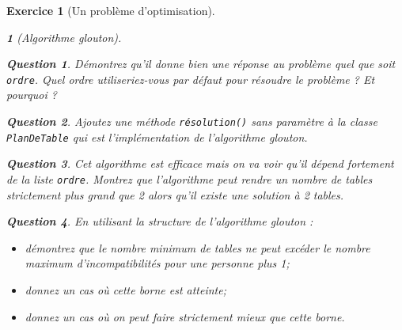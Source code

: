 \documentclass{article}
\theoremstyle{exostyle}
\newtheorem{exo}{Exercice}
\theoremstyle{partiestyle}
\newtheorem{partie}{}[exo]
\theoremstyle{questionstyle}
\newtheorem{questionpartie}{Question}[partie]
\begin{document}
\begin{exo}[Un problème d'optimisation]
\begin{partie}[Algorithme glouton]
\begin{questionpartie}
Démontrez qu'il donne bien une réponse au problème quel que soit \verb|ordre|. Quel ordre utiliseriez-vous par défaut pour résoudre le problème ? Et pourquoi ?
\end{questionpartie}

\begin{questionpartie}
Ajoutez une méthode \verb|résolution()| sans paramètre à la classe \verb+PlanDeTable+ qui est l'implémentation de l'algorithme glouton.
\end{questionpartie}

\begin{questionpartie}
Cet algorithme est efficace mais on va voir qu'il dépend fortement de la liste \verb|ordre|. Montrez que l'algorithme peut rendre un nombre de tables strictement plus grand que 2 alors qu'il existe une solution à 2 tables.
\end{questionpartie}

\begin{questionpartie}
En utilisant la structure de l'algorithme glouton :
\begin{itemize}
\item démontrez que le nombre minimum de tables ne peut excéder le nombre maximum d'incompatibilités pour une personne plus 1;
\item donnez un cas où cette borne est atteinte;
\item donnez un cas où on peut faire strictement mieux que cette borne.
\end{itemize}
\end{questionpartie}

\end{partie}

\end{exo}
\end{document}
